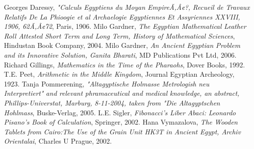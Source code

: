 \documentclass[12pt]{article}
\begin{document}
\begin{thebibliography}{8}

 Georges Daressy, \emph{"Calculs Egyptiens du Moyan EmpireÃ‚Â¢?, Recueil de Travaux Relatifs  De La  Phioogie et al Archaelogie Egyptiennes Et Assyriennes XXVIII, 1906, 62Ã‚Â¢72}, Paris, 1906.
 Milo Gardner, \emph{The Egyptian Mathematical Leather Roll Attested Short Term and Long Term, History of Mathematical Sciences}, Hindustan Book Company, 2004.
 Milo Gardner, \emph{An Ancient Egyptian Problem and its Innovative Solution, Ganita Bharati}, MD Publications Pvt Ltd, 2006.
Richard Gillings, \emph{Mathematics in the Time of the Pharaohs}, Dover Books, 1992.
 T.E. Peet, \emph{Arithmetic in the Middle Kingdom}, Journal Egyptian Archeology, 1923.
 Tanja Pommerening, \emph{"Altagyptische Holmasse Metrologish neu Interpretiert" and relevant phramaceutical and medical knowledge, an abstract,  Phillips-Universtat, Marburg, 8-11-2004, taken from "Die Altagyptschen Hohlmass}, Buske-Verlag, 2005.
 L.E. Sigler, \emph{Fibonacci's Liber Abaci: Leonardo Pisano's Book of Calculation}, Springer, 2002.
 Hana Vymazalova, \emph{The Wooden Tablets from Cairo:The Use of the Grain Unit HK3T in Ancient Egypt, Archiv Orientalai}, Charles U Prague, 2002.
\end{thebibliography}

\end{document}
